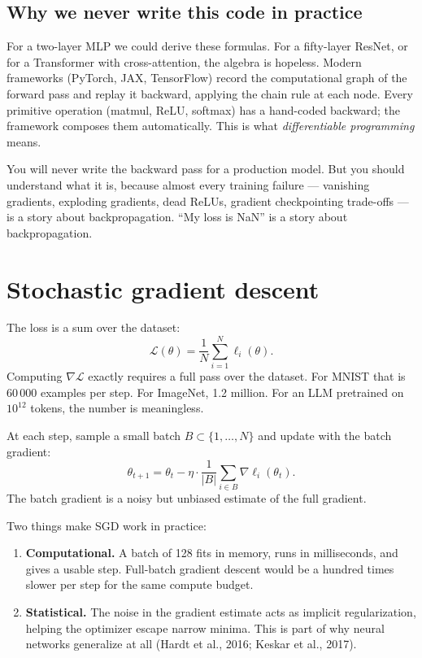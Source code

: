 \subsection{Why we never write this code in practice}

For a two-layer MLP we could derive these formulas. For a fifty-layer ResNet, or for a Transformer with cross-attention, the algebra is hopeless. Modern frameworks (PyTorch, JAX, TensorFlow) record the computational graph of the forward pass and replay it backward, applying the chain rule at each node. Every primitive operation (matmul, ReLU, softmax) has a hand-coded backward; the framework composes them automatically. This is what \emph{differentiable programming} means.

\begin{aitip}
You will never write the backward pass for a production model. But you should understand what it is, because almost every training failure --- vanishing gradients, exploding gradients, dead ReLUs, gradient checkpointing trade-offs --- is a story about backpropagation. ``My loss is NaN'' is a story about backpropagation.
\end{aitip}

\section{Stochastic gradient descent}

The loss is a sum over the dataset:
\[
\mathcal{L}(\theta) = \frac{1}{N} \sum_{i=1}^N \ell_i(\theta).
\]
Computing $\nabla \mathcal{L}$ exactly requires a full pass over the dataset. For MNIST that is 60\,000 examples per step. For ImageNet, 1.2 million. For an LLM pretrained on $10^{12}$ tokens, the number is meaningless.

\begin{definition}
At each step, sample a small batch $B \subset \{1, \ldots, N\}$ and update with the batch gradient:
\[
\theta_{t+1} = \theta_t - \eta \cdot \frac{1}{|B|} \sum_{i \in B} \nabla \ell_i(\theta_t).
\]
The batch gradient is a noisy but unbiased estimate of the full gradient.
\end{definition}

Two things make SGD work in practice:

\begin{enumerate}
  \item \textbf{Computational.} A batch of 128 fits in memory, runs in milliseconds, and gives a usable step. Full-batch gradient descent would be a hundred times slower per step for the same compute budget.
  \item \textbf{Statistical.} The noise in the gradient estimate acts as implicit regularization, helping the optimizer escape narrow minima. This is part of why neural networks generalize at all (Hardt et al., 2016; Keskar et al., 2017).
\end{enumerate}

